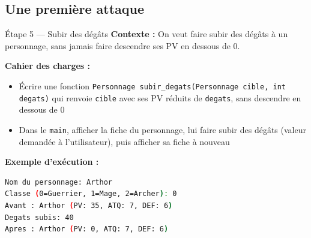 \subsection{Une première attaque}

\begin{UPSTIManipulation}{Étape 5 — Subir des dégâts}
  \textbf{Contexte :} On veut faire subir des dégâts à un personnage, sans jamais faire
  descendre ses PV en dessous de 0.

  \textbf{Cahier des charges :}
  \begin{itemize}
    \item Écrire une fonction \texttt{Personnage subir\_degats(Personnage cible, int degats)}
      qui renvoie \texttt{cible} avec ses PV réduits de \texttt{degats}, sans descendre en
      dessous de 0
    \item Dans le \texttt{main}, afficher la fiche du personnage, lui faire subir des dégâts
      (valeur demandée à l'utilisateur), puis afficher sa fiche à nouveau
  \end{itemize}

  \textbf{Exemple d'exécution :}
  \begin{lstlisting}[language=bash]
Nom du personnage: Arthor
Classe (0=Guerrier, 1=Mage, 2=Archer): 0
Avant : Arthor (PV: 35, ATQ: 7, DEF: 6)
Degats subis: 40
Apres : Arthor (PV: 0, ATQ: 7, DEF: 6)
  \end{lstlisting}

\end{UPSTIManipulation}

